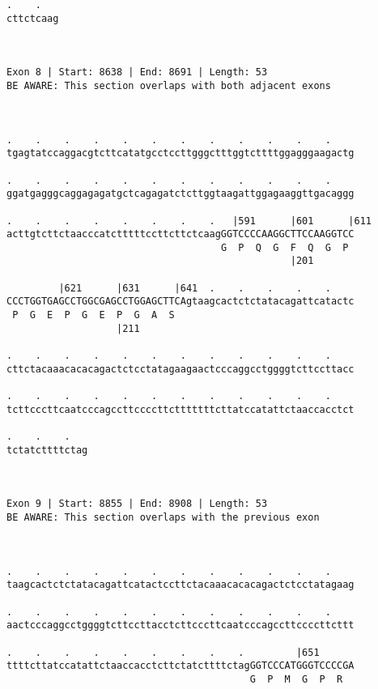 \documentclass{article}
\begin{document}
\begin{Verbatim}
.    .   
cttctcaag
         
         
 
Exon 8 | Start: 8638 | End: 8691 | Length: 53
BE AWARE: This section overlaps with both adjacent exons



.    .    .    .    .    .    .    .    .    .    .    .    
tgagtatccaggacgtcttcatatgcctccttgggctttggtcttttggagggaagactg
                                                            
.    .    .    .    .    .    .    .    .    .    .    .    
ggatgagggcaggagagatgctcagagatctcttggtaagattggagaaggttgacaggg
                                                            
.    .    .    .    .    .    .    .   |591      |601      |611
acttgtcttctaacccatctttttccttcttctcaagGGTCCCCAAGGCTTCCAAGGTCC
                                     G  P  Q  G  F  Q  G  P 
                                                 |201       
  
         |621      |631      |641  .    .    .    .    .    
CCCTGGTGAGCCTGGCGAGCCTGGAGCTTCAgtaagcactctctatacagattcatactc
 P  G  E  P  G  E  P  G  A  S                               
                   |211                                     
  
.    .    .    .    .    .    .    .    .    .    .    .    
cttctacaaacacacagactctcctatagaagaactcccaggcctggggtcttccttacc
                                                            
.    .    .    .    .    .    .    .    .    .    .    .    
tcttcccttcaatcccagccttccccttctttttttcttatccatattctaaccacctct
                                                            
.    .    .   
tctatcttttctag
              
              
 
Exon 9 | Start: 8855 | End: 8908 | Length: 53
BE AWARE: This section overlaps with the previous exon



.    .    .    .    .    .    .    .    .    .    .    .    
taagcactctctatacagattcatactccttctacaaacacacagactctcctatagaag
                                                            
.    .    .    .    .    .    .    .    .    .    .    .    
aactcccaggcctggggtcttccttacctcttcccttcaatcccagccttccccttcttt
                                                            
.    .    .    .    .    .    .    .    .         |651      
ttttcttatccatattctaaccacctcttctatcttttctagGGTCCCATGGGTCCCCGA
                                          G  P  M  G  P  R  
                                                            

\end{Verbatim}
\end{document}
